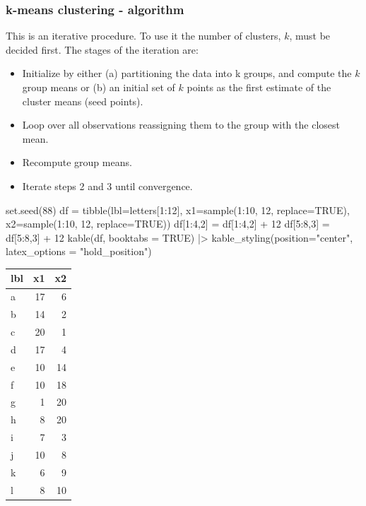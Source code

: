 \documentclass[a4paper]{article}
\begin{document}
\subsubsection{k-means clustering - algorithm}

This is an iterative procedure. To use it the number of clusters, \( k \), must be decided first.  The stages of the iteration are:
\begin{itemize}
	\item Initialize by either (a) partitioning the data into k groups, and compute the \( k \) group means or (b) an initial set of $k$ points as the first estimate of the cluster means (seed points).
	\item Loop over all observations reassigning them to the group with the closest mean.
	\item Recompute group means.
	\item Iterate steps 2 and 3 until convergence.
\end{itemize}
\begin{Schunk}
\begin{Sinput}
set.seed(88)
df = tibble(lbl=letters[1:12], 
			x1=sample(1:10, 12, replace=TRUE),
			x2=sample(1:10, 12, replace=TRUE))
df[1:4,2] = df[1:4,2] + 12
df[5:8,3] = df[5:8,3] + 12
kable(df, booktabs = TRUE) |>
  kable_styling(position="center", latex_options = "hold_position")
\end{Sinput}
\begin{table}[!h]
\centering
\begin{tabular}{lrr}
\toprule
lbl & x1 & x2\\
\midrule
a & 17 & 6\\
b & 14 & 2\\
c & 20 & 1\\
d & 17 & 4\\
e & 10 & 14\\
\addlinespace
f & 10 & 18\\
g & 1 & 20\\
h & 8 & 20\\
i & 7 & 3\\
j & 10 & 8\\
\addlinespace
k & 6 & 9\\
l & 8 & 10\\
\bottomrule
\end{tabular}
\end{table}

\end{Schunk}
\end{document}
